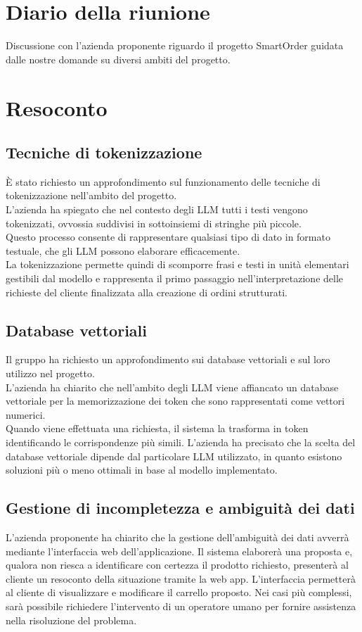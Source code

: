 \section{Diario della riunione}
Discussione con l'azienda proponente riguardo il progetto SmartOrder guidata dalle nostre domande su diversi ambiti del progetto.
\\
\section*{Resoconto}
\subsection{Tecniche di tokenizzazione}
È stato richiesto un approfondimento sul funzionamento delle tecniche di tokenizzazione nell'ambito del progetto.\\
L'azienda ha spiegato che nel contesto degli LLM tutti i testi vengono tokenizzati, ovvossia suddivisi in sottoinsiemi di stringhe più piccole. \\
Questo processo consente di rappresentare qualsiasi tipo di dato in formato testuale, che gli LLM possono elaborare efficacemente.\\
La tokenizzazione permette quindi di scomporre frasi e testi in unità elementari gestibili dal modello e rappresenta il primo passaggio nell'interpretazione delle richieste del cliente finalizzata alla creazione di ordini strutturati.
\subsection{Database vettoriali}
Il gruppo ha richiesto un approfondimento sui database vettoriali e sul loro utilizzo nel progetto.\\
L'azienda ha chiarito che nell'ambito degli LLM viene affiancato un database vettoriale per la memorizzazione dei token che sono rappresentati come vettori numerici.\\
Quando viene effettuata una richiesta, il sistema la trasforma in token identificando le corrispondenze più simili. 
L'azienda ha precisato che la scelta del database vettoriale dipende dal particolare LLM utilizzato, in quanto esistono soluzioni più o meno ottimali in base al modello implementato.

\subsection{Gestione di incompletezza e ambiguità dei dati}
L'azienda proponente ha chiarito che la gestione dell'ambiguità dei dati avverrà mediante l'interfaccia web dell'applicazione. Il sistema elaborerà una proposta e, qualora non riesca a identificare con certezza il prodotto richiesto, presenterà al cliente un resoconto della situazione tramite la web app. L'interfaccia permetterà al cliente di visualizzare e modificare il carrello proposto. Nei casi più complessi, sarà possibile richiedere l'intervento di un operatore umano per fornire assistenza nella risoluzione del problema.

